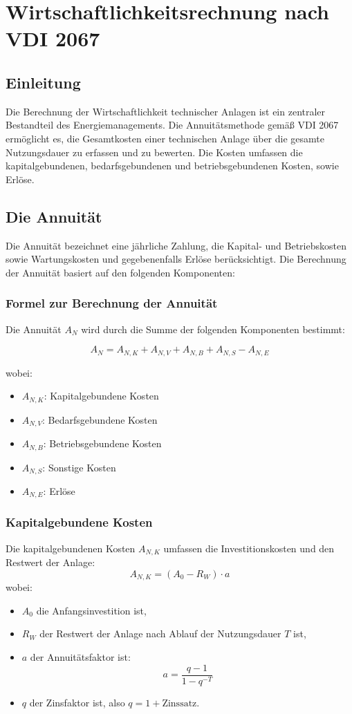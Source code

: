 \section{Wirtschaftlichkeitsrechnung nach VDI 2067}
\label{sec:annuity_doc}

\subsection{Einleitung}
Die Berechnung der Wirtschaftlichkeit technischer Anlagen ist ein zentraler Bestandteil des Energiemanagements. Die Annuitätsmethode gemäß VDI 2067 ermöglicht es, die Gesamtkosten einer technischen Anlage über die gesamte Nutzungsdauer zu erfassen und zu bewerten. Die Kosten umfassen die kapitalgebundenen, bedarfsgebundenen und betriebsgebundenen Kosten, sowie Erlöse.

\subsection{Die Annuität}
Die Annuität bezeichnet eine jährliche Zahlung, die Kapital- und Betriebskosten sowie Wartungskosten und gegebenenfalls Erlöse berücksichtigt. Die Berechnung der Annuität basiert auf den folgenden Komponenten:

\subsubsection{Formel zur Berechnung der Annuität}
Die Annuität \(A_N\) wird durch die Summe der folgenden Komponenten bestimmt:

\[
A_N = A_{N,K} + A_{N,V} + A_{N,B} + A_{N,S} - A_{N,E}
\]

wobei:
\begin{itemize}
    \item \(A_{N,K}\): Kapitalgebundene Kosten
    \item \(A_{N,V}\): Bedarfsgebundene Kosten
    \item \(A_{N,B}\): Betriebsgebundene Kosten
    \item \(A_{N,S}\): Sonstige Kosten
    \item \(A_{N,E}\): Erlöse
\end{itemize}

\subsubsection{Kapitalgebundene Kosten}
Die kapitalgebundenen Kosten \(A_{N,K}\) umfassen die Investitionskosten und den Restwert der Anlage:
\[
A_{N,K} = (A_0 - R_W) \cdot a
\]
wobei:
\begin{itemize}
    \item \(A_0\) die Anfangsinvestition ist,
    \item \(R_W\) der Restwert der Anlage nach Ablauf der Nutzungsdauer \(T\) ist,
    \item \(a\) der Annuitätsfaktor ist:
    \[
    a = \frac{q - 1}{1 - q^{-T}}
    \]
    \item \(q\) der Zinsfaktor ist, also \(q = 1 + \text{Zinssatz}\).
\end{itemize}

